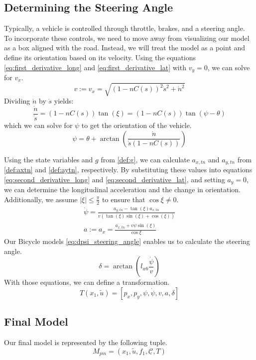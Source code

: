\subsection{Determining the Steering Angle} \label{subsec:determining_the_steering_angle}
Typically, a vehicle is controlled through throttle, brakes, and a steering angle.
To incorporate these controls, we need to move away from visualizing our model as a box aligned with the road.
Instead, we will treat the model as a point and define its orientation based on its velocity.
Using the equations \eqref{eq:first_derivative_long} and \eqref{eq:first_derivative_lat} with $v_y = 0$, we can solve for $v_x$.
\begin{equation}
	v := v_x = \sqrt{(1-nC(s))^2\dot{s}^2 + \dot{n}^2}
\end{equation}
Dividing $\dot{n}$ by $\dot{s}$ yields:
\begin{equation}
	\frac{\dot{n}}{\dot{s}} = (1-nC(s))\tan(\xi) = (1-nC(s))\tan(\psi - \theta)
\end{equation}
which we can solve for $\psi$ to get the orientation of the vehicle.
\begin{equation}
	\psi = \theta + \arctan(\frac{\dot{n}}{\dot{s}(1-nC(s))})
\end{equation}

Using the state variables and $g$ from \eqref{def:g}, we can calculate $a_{x,tn}$ and $a_{y,tn}$ from \eqref{def:axtn} and \eqref{def:aytn},
respectively.
By substituting these values into equations \eqref{eq:second_derivative_long} and \eqref{eq:second_derivative_lat}, and setting $a_y = 0$, we can
determine the longitudinal acceleration and the change in orientation.
Additionally, we assume $|\xi| \leq \frac{\pi}{2}$ to ensure that $\cos{\xi} \neq 0$.
\begin{align}
	\dot{\psi} = \frac{a_{y,tn} - \tan(\xi) a_{x,tn}}{v (\tan(\xi) \sin(\xi) + \cos(\xi))} \\
	a := a_x = \frac{a_{x,tn} + v \dot{\psi} \sin(\xi)}{\cos{\xi}}
\end{align}
Our Bicycle models \eqref{eq:dpsi_steering_angle} enables us to calculate the steering angle.
\begin{equation}
	\delta = \arctan(l_{wb}\frac{\dot{\psi}}{v})
\end{equation}
With those equations, we can define a transformation.
\begin{equation}
	T(x_1, \tilde{u}) = [p_x, p_y, \psi, \dot{\psi}, v, a, \delta] \label{eq:pm_state_transformation} \end{equation}

\subsection{Final Model} \label{subsec:pm_resulting_model}

Our final model is represented by the following tuple.
\begin{equation}
	M_{pm} = (x_1, \tilde{u}, f_1, \underline{\mathcal{C}}, T)
	\label{model:point_mass}
\end{equation}
